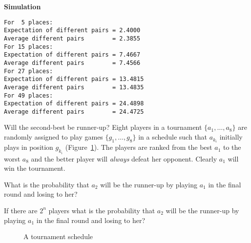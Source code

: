 \textbf{Simulation}
\begin{verbatim}
For  5 places:
Expectation of different pairs = 2.4000
Average different pairs        = 2.3855
For 15 places:
Expectation of different pairs = 7.4667
Average different pairs        = 7.4566
For 27 places:
Expectation of different pairs = 13.4815
Average different pairs        = 13.4835
For 49 places:
Expectation of different pairs = 24.4898
Average different pairs        = 24.4725
\end{verbatim}


\begin{prob}{Will the second-best be runner-up?}
Eight players in a tournament $\{a_1,\ldots,a_8\}$ are randomly assigned to play games $\{g_1,\ldots,g_8\}$ in a schedule such that $a_{k_{i}}$ initially plays in position $g_{k_{i}}$ (Figure~\ref{f.tournament}). The players are ranked from the best $a_1$ to the worst $a_8$ and the better player will \emph{always} defeat her opponent.  Clearly $a_1$ will win the tournament.

 What is the probability that $a_2$ will be the runner-up by playing $a_1$ in the final round and losing to her?

 If there are $2^n$ players what is the probability that $a_2$ will be the runner-up by playing $a_1$ in the final round and losing to her?
\end{prob}
\begin{figure}[tb]
\begin{center}
\end{center}
\caption{A tournament schedule}\label{f.tournament}
\end{figure}

